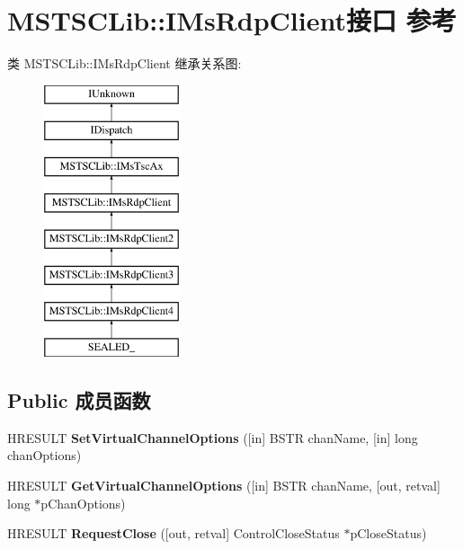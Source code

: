 \hypertarget{interface_m_s_t_s_c_lib_1_1_i_ms_rdp_client}{}\section{M\+S\+T\+S\+C\+Lib\+:\+:I\+Ms\+Rdp\+Client接口 参考}
\label{interface_m_s_t_s_c_lib_1_1_i_ms_rdp_client}
类 M\+S\+T\+S\+C\+Lib\+:\+:I\+Ms\+Rdp\+Client 继承关系图\+:\begin{figure}[H]
\begin{center}
\leavevmode
\includegraphics[height=8.000000cm]{interface_m_s_t_s_c_lib_1_1_i_ms_rdp_client}
\end{center}
\end{figure}
\subsection*{Public 成员函数}
\begin{DoxyCompactItemize}
\item 
\mbox{\label{interface_m_s_t_s_c_lib_1_1_i_ms_rdp_client_a8fea6f10285723a3a7a985ed276b73c6}} 
H\+R\+E\+S\+U\+LT {\bfseries Set\+Virtual\+Channel\+Options} (\mbox{[}in\mbox{]} B\+S\+TR chan\+Name, \mbox{[}in\mbox{]} long chan\+Options)
\item 
\mbox{\label{interface_m_s_t_s_c_lib_1_1_i_ms_rdp_client_ae202f896ac4985ce8c2107a83ae3143e}} 
H\+R\+E\+S\+U\+LT {\bfseries Get\+Virtual\+Channel\+Options} (\mbox{[}in\mbox{]} B\+S\+TR chan\+Name, \mbox{[}out, retval\mbox{]} long $\ast$p\+Chan\+Options)
\item 
\mbox{\label{interface_m_s_t_s_c_lib_1_1_i_ms_rdp_client_ab645bc19b3aab9799a0f9d75b3eeef40}} 
H\+R\+E\+S\+U\+LT {\bfseries Request\+Close} (\mbox{[}out, retval\mbox{]} Control\+Close\+Status $\ast$p\+Close\+Status)
\end{DoxyCompactItemize}
